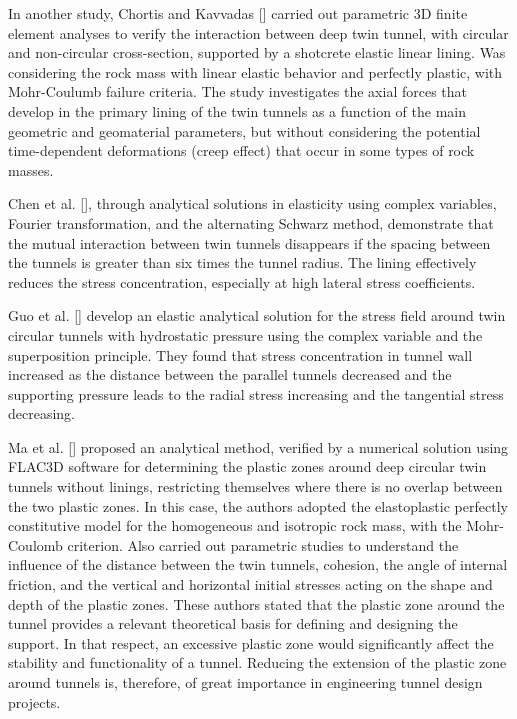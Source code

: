 \documentclass[a4paper,fleqn]{cas-sc}
\begin{document}
In another study, Chortis and Kavvadas [] carried out parametric 3D finite element analyses to verify the interaction between deep twin tunnel, with circular and non-circular cross-section, supported by a shotcrete elastic linear lining. Was considering the rock mass with linear elastic behavior and perfectly plastic, with Mohr-Coulumb failure criteria. The study investigates the axial forces that develop in the primary lining of the twin tunnels as a function of the main geometric and geomaterial parameters, but without considering the potential time-dependent deformations (creep effect) that occur in some types of rock masses.

Chen et al. [], through analytical solutions in elasticity using complex variables, Fourier transformation, and the alternating Schwarz method, demonstrate that the mutual interaction between twin tunnels disappears if the spacing between the tunnels is greater than six times the tunnel radius. The lining effectively reduces the stress concentration, especially at high lateral stress coefficients.

Guo et al. [] develop an elastic analytical solution for the stress field around twin circular tunnels with hydrostatic pressure using the complex variable and the superposition principle. They found that stress concentration in tunnel wall increased as the distance between the parallel tunnels decreased and the supporting pressure leads to the radial stress increasing and the tangential stress decreasing.

Ma et al. [] proposed an analytical method, verified by a numerical solution using FLAC3D software for determining the plastic zones around deep circular twin tunnels without linings, restricting themselves where there is no overlap between the two plastic zones. In this case, the authors adopted the elastoplastic perfectly constitutive model for the homogeneous and isotropic rock mass, with the Mohr-Coulomb criterion. Also carried out parametric studies to understand the influence of the distance between the twin tunnels, cohesion, the angle of internal friction, and the vertical and horizontal initial stresses acting on the shape and depth of the plastic zones. These authors stated that the plastic zone around the tunnel provides a relevant theoretical basis for defining and designing the support. In that respect, an excessive plastic zone would significantly affect the stability and functionality of a tunnel. Reducing the extension of the plastic zone around tunnels is, therefore, of great importance in engineering tunnel design projects.
\end{document}
